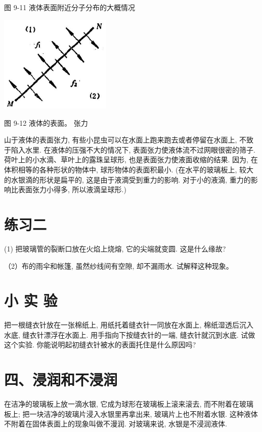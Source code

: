 \documentclass[10pt]{article}
\begin{document}
图 9-11 液体表面附近分子分布的大概情况

\begin{center}
\includegraphics[max width=0.4\textwidth]{images/01912d55-147c-70aa-b0e0-1782a122f948_266_545499.jpg}
\end{center}

图 9-12 液体的表面。 张力

山于液体的表面张力, 有些小昆虫可以在水面上跑来跑去或者停留在水面上, 不致于陷入水里. 在液体的压强不大的情况下, 表面张力使液体流不过网眼很密的筛子. 荷叶上的小水滴、草叶上的露珠呈球形, 也是表面张力使液面收缩的结果. 因为, 在体积相等的各种形状的物体中, 球形物体的表面积最小. (在水平的玻璃板上, 较大的水银滴的形状是扁平的, 这是由于液滴受到重力的影响. 对于小的液滴, 重力的影响比表面张力小得多, 所以液滴呈球形.)

\section*{练习二}

(1) 把玻璃管的裂断口放在火焰上烧熔, 它的尖端就变圆. 这是什么缘故?

（2）布的雨伞和帐篷, 虽然纱线间有空隙, 却不漏雨水. 试解释这种现象。

\section*{小 实 验}

把一根缝衣针放在一张棉纸上, 用纸托着缝衣针一同放在水面上, 棉纸湿透后沉入水底, 缝衣针漂浮在水面上. 用手指向下按缝衣针的一端, 缝衣针就沉到水底. 试做这个实验. 你能说明起初缝衣针被水的表面托住是什么原因吗?

\section*{四、浸润和不浸润}

在洁净的玻璃板上放一滴水银, 它成为球形在玻璃板上滚来滚去, 而不附着在玻璃板上; 把一块洁净的玻璃片浸入水银里再拿出来, 玻璃片上也不附着水银. 这种液体不附着在固体表面上的现象叫做不漫润. 对玻璃来说, 水银是不浸润液体.
\end{document}
